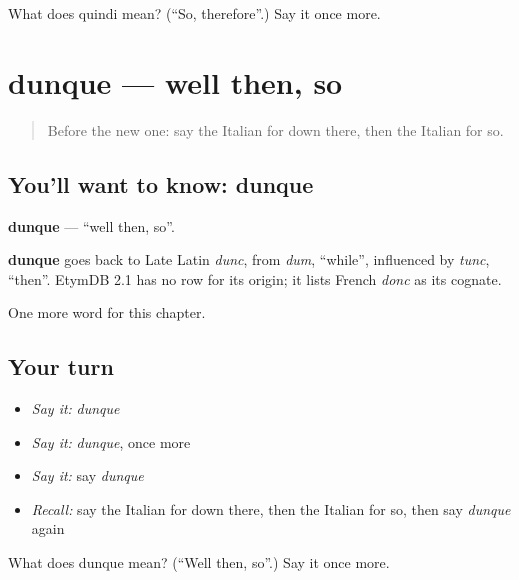 \begin{tcolorbox}[breakable,colback=teal!4,colframe=teal!35!black,title={Before you move on}]
What does quindi mean? (\textquotedblleft{}So, therefore\textquotedblright{}.) Say it once more.
\end{tcolorbox}
\section[dunque]{dunque — well then, so}

\label{lesson:IT-C155-dunque}



\begin{quote}
Before the new one: say the Italian for down there, then the Italian for so.
\end{quote}

\subsection*{You'll want to know: dunque}
\textbf{dunque} — \textquotedblleft{}well then, so\textquotedblright{}.

\begin{cousinweb}
\textbf{dunque} goes back to Late Latin \emph{dunc}, from \emph{dum}, \textquotedblleft{}while\textquotedblright{}, influenced by \emph{tunc}, \textquotedblleft{}then\textquotedblright{}. EtymDB 2.1 has no row for its origin; it lists French \emph{donc} as its cognate.
\end{cousinweb}

\begin{grammarlens}[title={What you've built}]
One more word for this chapter.
\end{grammarlens}

\subsection*{Your turn}
\begin{itemize}
\raggedright
  \item \emph{Say it:} \emph{dunque}
  \item \emph{Say it:} \emph{dunque}, once more
  \item \emph{Say it:} say \emph{dunque}
  \item \emph{Recall:} say the Italian for down there, then the Italian for so, then say \emph{dunque} again
\end{itemize}

\begin{tcolorbox}[breakable,colback=teal!4,colframe=teal!35!black,title={Before you move on}]
What does dunque mean? (\textquotedblleft{}Well then, so\textquotedblright{}.) Say it once more.
\end{tcolorbox}
